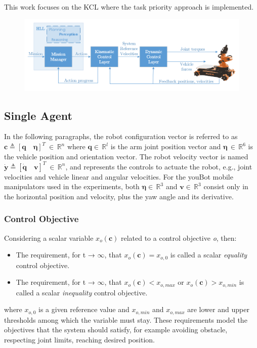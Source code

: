 \documentclass[a4paper, 12pt, notitlepage]{article}
\begin{document}
\begin{multicols}{2}
		This work focuses on the KCL where the task priority approach is implemented. 
		
		\vspace{-10px}
		\begin{figure}[H]
			\centering
			\includegraphics[scale=0.17]{controlArch}
			\label{fig:controlArch}
		\end{figure}
		
		\subsection{Single Agent}\label{subsec:sinag}
		\hspace{7px} In the following paragraphs, the robot configuration vector is referred to as $\boldsymbol{c} \triangleq [\boldsymbol{q} \quad \boldsymbol{\eta}]^T \:\in \,\mathbb{R}^n$ where $\boldsymbol{q} \in \,\mathbb{R}^l$ is the arm joint position vector and  $\boldsymbol{\eta} \, \in \,\mathbb{R}^6$ is the vehicle position and orientation vector. The robot velocity vector is named $\boldsymbol{\dot{y}} \triangleq [\boldsymbol{\dot{q}} \quad \boldsymbol{v}]^T \:\in \,\mathbb{R}^n$, and represents the controls to actuate the robot, e.g., joint velocities and vehicle linear and angular velocities. For the youBot mobile manipulators used in the experiments, both $\boldsymbol{\eta} \in \,\mathbb{R}^3$ and $\boldsymbol{v} \in \,\mathbb{R}^3$ consist only in the horizontal position and velocity, plus the yaw angle and its derivative.
		\subsubsection{Control Objective}
		\hspace{7px} Considering a scalar variable  $x_o(\textbf{c})$ related to a control objective \textit{o}, then:
		\begin{itemize}[leftmargin=*]
	
			\item The requirement, for t → $\infty$, that $x_o (\boldsymbol{c}) = x_{o,0}$ is called
			a scalar \textit{equality} control objective.
			\item The requirement, for t → $\infty$, that $x_o(\boldsymbol{c}) < x_{o,max}$ or
			$x_o(\boldsymbol{c}) > x_{o,min}$ is called a scalar \textit{inequality} control objective.
		\end{itemize}
		where $x_{o,0}$ is a given reference value and $x_{o,min}$ and $x_{o,max}$ are lower and upper thresholds among which the variable must stay.
		These requirements model the objectives that the system should satisfy, for example avoiding obstacle, respecting joint limits, reaching desired position.
		

\end{multicols}
\end{document}
